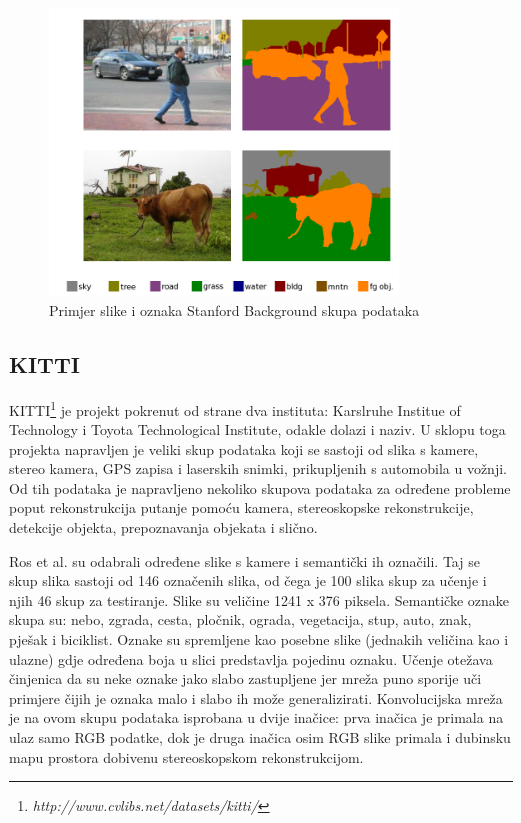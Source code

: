 \documentclass[times, utf8, diplomski, numeric]{fer}
\begin{document}
\begin{figure}[htb]
\centering
\includegraphics[width=350px]{imgs/dag-example.png}
\caption{Primjer slike i oznaka Stanford Background skupa podataka}
\label{fig:stanford_dataset}
\end{figure}

\subsection{KITTI}
KITTI\footnote{\emph{http://www.cvlibs.net/datasets/kitti/}} je projekt pokrenut od strane dva instituta: Karslruhe Institue of Technology i Toyota Technological Institute, odakle dolazi i naziv. U sklopu toga projekta napravljen je veliki skup podataka koji se sastoji od slika s kamere, stereo kamera, GPS zapisa i laserskih snimki, prikupljenih s automobila u vožnji. Od tih podataka je napravljeno nekoliko skupova
podataka za određene probleme poput rekonstrukcija putanje pomoću kamera, stereoskopske rekonstrukcije, detekcije objekta, prepoznavanja objekata i slično.

Ros et al.\cite{ros:2015} su odabrali određene slike s kamere i semantički ih označili. Taj se skup slika sastoji od 146 označenih slika, od čega je 100 slika skup za učenje i njih 46 skup za testiranje. Slike su veličine 1241 x 376 piksela.
Semantičke oznake skupa su: nebo, zgrada, cesta, pločnik, ograda, vegetacija, stup, auto, znak, pješak i biciklist. Oznake su spremljene kao posebne slike (jednakih veličina kao i ulazne) gdje određena boja u slici predstavlja pojedinu oznaku.
Učenje otežava činjenica da su neke oznake jako slabo zastupljene jer mreža puno sporije uči primjere čijih je oznaka malo i slabo ih može generalizirati.
Konvolucijska mreža je na ovom skupu podataka isprobana u dvije inačice: prva inačica je primala na ulaz samo RGB podatke, dok je druga inačica osim RGB slike primala i dubinsku mapu prostora dobivenu stereoskopskom rekonstrukcijom.
\end{document}
